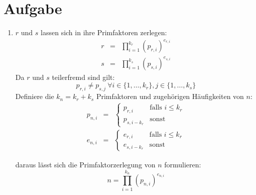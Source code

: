 \documentclass[DIN, pagenumber=false, fontsize=11pt, parskip=half]{scrartcl}
\begin{document}
    \section{Aufgabe}
    \begin{enumerate}[label=(\roman*)]
        \item
            $r$ und $s$ lassen sich in ihre Primfaktoren zerlegen:
            \begin{eqnarray}
                r &=& \prod_{i=1}^{k_r} {(p_{r,i})}^{e_{r,i}} \\
                s &=& \prod_{i=1}^{k_s} {(p_{s,i})}^{e_{s,i}}
            \end{eqnarray}
            Da $r$ und $s$ teilerfremd sind gilt:
            \begin{equation}
                p_{r,i} \neq p_{s,j}\ \forall i \in \{1,\ldots, k_r\}, j \in \{1,\ldots, k_s\}
            \end{equation}
            Definiere die $k_n = k_r + k_s$ Primfaktoren und zugehörigen Häufigkeiten von $n$:
            \begin{eqnarray}
                p_{n,i} &=&
                    \begin{cases}
                        p_{r,i} & \text{falls } i \leq k_r \\
                        p_{s,i-k_r} & \text{sonst}
                    \end{cases}\\
                e_{n,i} &=&
                    \begin{cases}
                        e_{r,i} & \text{falls } i \leq k_r \\
                        e_{s,i-k_r} & \text{sonst}
                    \end{cases}
            \end{eqnarray}

            daraus lässt sich die Primfaktorzerlegung von $n$ formulieren:
            \begin{equation}
                n = \prod_{i=1}^{k_n} {(p_{n,i})}^{e_{n,i}}
            \end{equation}


\end{enumerate}
\end{document}
